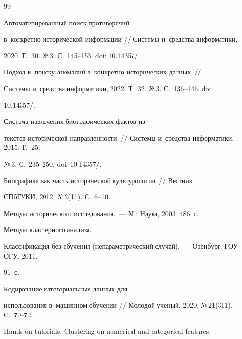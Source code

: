 {{\begin{thebibliography}{99}


   Автоматизированный поиск противоречий  


в~кон\-крет\-но-ис\-то\-ри\-че\-ской информации /\!\!/ Системы и~средства информатики, 


2020. Т.~30. №\,3. С.~145--153. doi: 10.14357\!/.




   Подход к~поиску аномалий в~конкретно-ис\-то\-ри\-че\-ских данных~/\!\!/ 


  Системы и~средства информатики, 2022. Т.~32. №\,3. С.~136--146. doi: 


10.14357\!/.


  




   Система извлечения биографических фактов из 


текстов исторической направленности~/\!\!/ Системы и~средства информатики, 2015. Т.~25. 


№\,3. С.~235--250. doi: 10.14357\!/.




   Биографика как часть исторической культурологии~/\!\!/ Вестник 


СПбГУКИ, 2012. №\,2(11). С.~6--10.




   Методы исторического исследования.~--- М.: Наука, 2003. 486~с.




   Методы кластерного анализа. 


Классификация без обучения (непараметрический случай).~--- Оренбург: ГОУ ОГУ, 2011. 


91~с.




   Кодирование категориальных данных для 


использования в~машинном обучении /\!\!/ Молодой ученый, 2020. №\,21(311). С.~70--72.




   Hands-on tutorials. Clustering on numerical and categorical features. 



\end{thebibliography}}}
